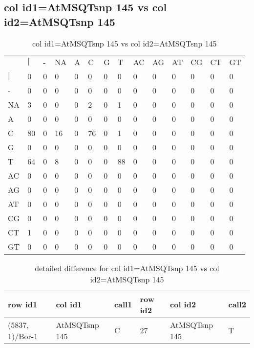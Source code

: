 \subsection{col id1=AtMSQTsnp 145 vs col id2=AtMSQTsnp 145}
\begin{center}
\begin{longtable}{|l|l|l|l|l|l|l|l|l|l|l|l|l|l|}
\caption{col id1=AtMSQTsnp 145 vs col id2=AtMSQTsnp 145} \label{table_dm722}\\
\hline
\\
\hline
&$|$&-&NA&A&C&G&T&AC&AG&AT&CG&CT&GT\\
$|$&0&0&0&0&0&0&0&0&0&0&0&0&0\\
-&0&0&0&0&0&0&0&0&0&0&0&0&0\\
NA&3&0&0&0&2&0&1&0&0&0&0&0&0\\
A&0&0&0&0&0&0&0&0&0&0&0&0&0\\
C&80&0&16&0&76&0&1&0&0&0&0&0&0\\
G&0&0&0&0&0&0&0&0&0&0&0&0&0\\
T&64&0&8&0&0&0&88&0&0&0&0&0&0\\
AC&0&0&0&0&0&0&0&0&0&0&0&0&0\\
AG&0&0&0&0&0&0&0&0&0&0&0&0&0\\
AT&0&0&0&0&0&0&0&0&0&0&0&0&0\\
CG&0&0&0&0&0&0&0&0&0&0&0&0&0\\
CT&1&0&0&0&0&0&0&0&0&0&0&0&0\\
GT&0&0&0&0&0&0&0&0&0&0&0&0&0\\
\hline
\end{longtable}
\end{center}

\begin{center}
\begin{longtable}{|l|l|l|l|l|l|}
\caption{detailed difference for col id1=AtMSQTsnp 145 vs col id2=AtMSQTsnp 145} \label{table_dm723}\\
\hline
row id1&col id1&call1&row id2&col id2&call2\\
\hline
(5837, 1)/Bor-1&AtMSQTsnp 145&C&27&AtMSQTsnp 145&T\\
\hline
\end{longtable}
\end{center}

